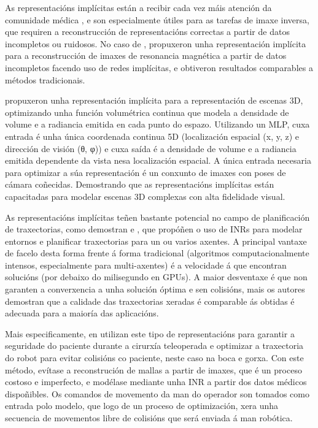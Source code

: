As representacións implícitas están a recibir cada vez máis atención da comunidade médica \cite{molaei2023implicitneuralrepresentationmedical}, e son 
especialmente útiles para as tarefas de imaxe inversa, que requiren a reconstrucción de representacións correctas a partir de datos incompletos ou ruidosos. 
No caso de \cite{shen2023nerpimplicitneuralrepresentation}, propuxeron unha representación implícita para a reconstrucción de imaxes de resonancia magnética a partir de datos incompletos facendo uso de redes implícitas, 
e obtiveron resultados comparables a métodos tradicionais.

\cite{mildenhall2020nerfrepresentingscenesneural} propuxeron unha representación implícita para a representación de escenas 3D, 
 optimizando unha función volumétrica continua que modela a densidade de volume e a radiancia emitida en cada punto do espazo.
 Utilizando un MLP, cuxa entrada é unha única coordenada continua 5D (localización espacial (x, y, z) e dirección de visión (θ, φ)) 
 e cuxa saída é a densidade de volume e a radiancia emitida dependente da vista nesa localización espacial. 
A única entrada necesaria para optimizar a súa representación é un conxunto de imaxes con poses de cámara coñecidas. 
Demostrando que as representacións implícitas están capacitadas para modelar escenas 3D complexas con alta fidelidade visual.
 
As representacións implícitas teñen bastante potencial no campo de planificación de traxectorias, como demostran \cite{yu2024neuraltrajectorymodelimplicit} e \cite{trajectinr}, 
que propóñen o uso de INRs para modelar entornos e planificar traxectorias para un ou varios axentes.
A principal vantaxe de facelo desta forma frente á forma tradicional (algoritmos computacionalmente intensos, especialmente para multi-axentes) é a velocidade á que encontran solucións (por debaixo do milisegundo en GPUs).
A maior desventaxe é que non garanten a converxencia a unha solución óptima e sen colisións, mais os autores demostran que a calidade das traxectorias xeradas é comparable ás obtidas é adecuada para a maioría das aplicacións.

Mais especificamente, en \cite{teleoperatdrob} utilizan este tipo de representacións para garantir a seguridade do paciente durante a cirurxía teleoperada e optimizar a traxectoria do robot para evitar colisións co paciente, neste caso na boca e gorxa.
Con este método, evítase a reconstrución de mallas a partir de imaxes, que é un proceso costoso e imperfecto, e modélase mediante unha INR a partir dos datos médicos dispoñibles.
Os comandos de movemento da man do operador son tomados como entrada polo modelo, que logo de un proceso de optimización, xera unha secuencia de movementos libre de colisións que será enviada á man robótica.


